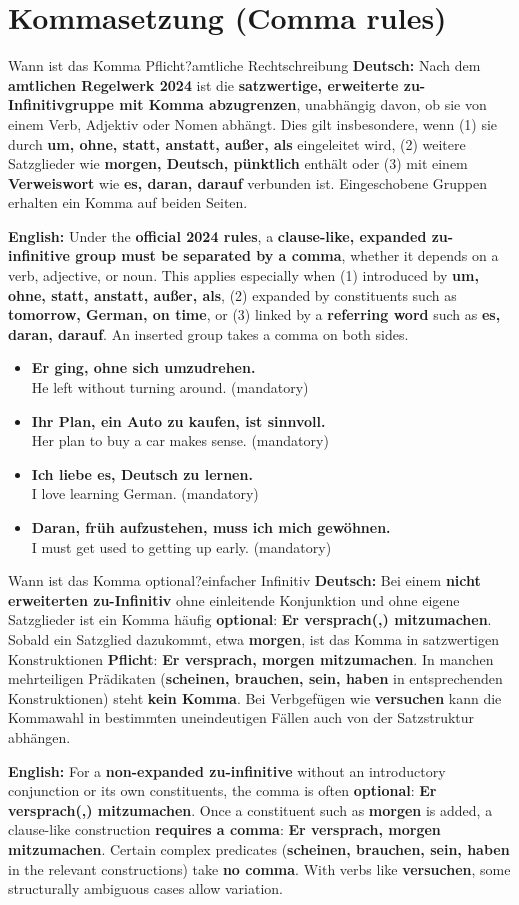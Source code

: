 \documentclass[a4paper,11pt]{article}
\newcommand{\GermanText}[1]{\textbf{Deutsch: }#1\par}
\newcommand{\EnglishText}[1]{{\small\color{SoftGray}\textbf{English: }#1\par}}
\newcommand{\ExampleItem}[2]{\item \textbf{#1}\\{\small\color{SoftGray}#2}}
\begin{document}
\section{Kommasetzung \textnormal{(Comma rules)}}
\begin{grammarentry}{Wann ist das Komma Pflicht?}{amtliche Rechtschreibung}
\GermanText{Nach dem \textbf{amtlichen Regelwerk 2024} ist die \textbf{satzwertige, erweiterte zu-Infinitivgruppe mit Komma abzugrenzen}, unabhängig davon, ob sie von einem Verb, Adjektiv oder Nomen abhängt. Dies gilt insbesondere, wenn (1) sie durch \textbf{um, ohne, statt, anstatt, außer, als} eingeleitet wird, (2) weitere Satzglieder wie \textbf{morgen, Deutsch, pünktlich} enthält oder (3) mit einem \textbf{Verweiswort} wie \textbf{es, daran, darauf} verbunden ist. Eingeschobene Gruppen erhalten ein Komma auf beiden Seiten.}
\EnglishText{Under the \textbf{official 2024 rules}, a \textbf{clause-like, expanded zu-infinitive group must be separated by a comma}, whether it depends on a verb, adjective, or noun. This applies especially when (1) introduced by \textbf{um, ohne, statt, anstatt, außer, als}, (2) expanded by constituents such as \textbf{tomorrow, German, on time}, or (3) linked by a \textbf{referring word} such as \textbf{es, daran, darauf}. An inserted group takes a comma on both sides.}
\end{grammarentry}
\begin{exbox}\begin{itemize}
\ExampleItem{Er ging, ohne sich umzudrehen.}{He left without turning around. (mandatory)}
\ExampleItem{Ihr Plan, ein Auto zu kaufen, ist sinnvoll.}{Her plan to buy a car makes sense. (mandatory)}
\ExampleItem{Ich liebe es, Deutsch zu lernen.}{I love learning German. (mandatory)}
\ExampleItem{Daran, früh aufzustehen, muss ich mich gewöhnen.}{I must get used to getting up early. (mandatory)}
\end{itemize}\end{exbox}
\begin{grammarentry}{Wann ist das Komma optional?}{einfacher Infinitiv}
\GermanText{Bei einem \textbf{nicht erweiterten zu-Infinitiv} ohne einleitende Konjunktion und ohne eigene Satzglieder ist ein Komma häufig \textbf{optional}: \textbf{Er versprach(,) mitzumachen}. Sobald ein Satzglied dazukommt, etwa \textbf{morgen}, ist das Komma in satzwertigen Konstruktionen \textbf{Pflicht}: \textbf{Er versprach, morgen mitzumachen}. In manchen mehrteiligen Prädikaten (\textbf{scheinen, brauchen, sein, haben} in entsprechenden Konstruktionen) steht \textbf{kein Komma}. Bei Verbgefügen wie \textbf{versuchen} kann die Kommawahl in bestimmten uneindeutigen Fällen auch von der Satzstruktur abhängen.}
\EnglishText{For a \textbf{non-expanded zu-infinitive} without an introductory conjunction or its own constituents, the comma is often \textbf{optional}: \textbf{Er versprach(,) mitzumachen}. Once a constituent such as \textbf{morgen} is added, a clause-like construction \textbf{requires a comma}: \textbf{Er versprach, morgen mitzumachen}. Certain complex predicates (\textbf{scheinen, brauchen, sein, haben} in the relevant constructions) take \textbf{no comma}. With verbs like \textbf{versuchen}, some structurally ambiguous cases allow variation.}
\end{grammarentry}
\end{document}
